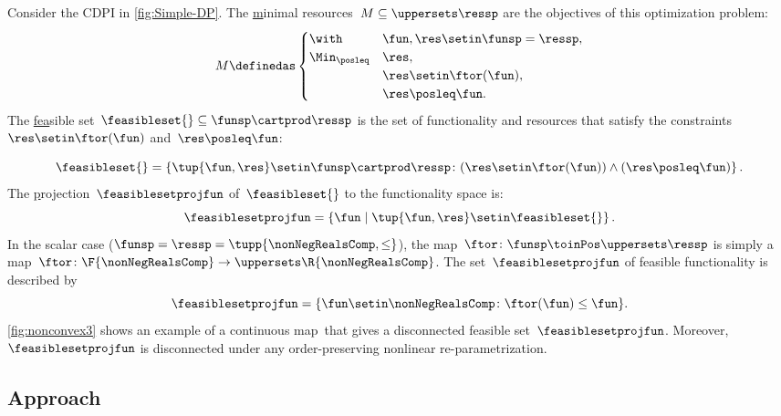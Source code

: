 \begin{example}
    \label{exa:one}
    Consider the CDPI in \cref{fig:Simple-DP}.
    The \uline{m}inimal resources~$M\subseteq\uppersets \ressp$ are the objectives of this optimization problem:
    \begin{equation*}
        M\definedas\begin{cases}
            \with          & \fun,\res\setin\funsp=\ressp, \\
            \Min_{\posleq} & \res,                      \\
                           & \res\setin\ftor(\fun),        \\
                           & \res\posleq\fun.
        \end{cases}
    \end{equation*}
    The \uline{fea}sible set~$\feasibleset{}\subseteq\funsp\cartprod\ressp$ is the set of functionality and resources that satisfy the constraints~$\res\setin\ftor(\fun)$ and~$\res\posleq\fun$:

    \begin{equation}
        \feasibleset{}=\left\{ \tup{\fun,\res}\setin\funsp\cartprod\ressp\colon (\res\setin\ftor(\fun))\wedge(\res\posleq\fun)\right\} .
        \label{eq:feasible}
    \end{equation}
    The \uline{p}rojection~$\feasiblesetprojfun$ of~$\feasibleset{}$ to the functionality space is:
    \begin{equation*}
        \feasiblesetprojfun=\left\{ \fun\mid\tup{\fun,\res} \setin\feasibleset{}\right\}.
    \end{equation*}
    In the scalar case ($\funsp=\ressp=\tupp{\nonNegRealsComp,\leq}$), the map~$\ftor\colon\funsp\toinPos\uppersets \ressp$ is simply a map~$\ftor\colon\F{\nonNegRealsComp}\to \uppersets\R{\nonNegRealsComp}$.
    The set~$\feasiblesetprojfun$ of feasible functionality is described by
    \begin{equation}
        \feasiblesetprojfun=\{\fun\setin\nonNegRealsComp\colon \ftor(\fun)\leq\fun\}.
        \label{eq:Pfeasible}
    \end{equation}
    \cref{fig:nonconvex3} shows an example of a continuous map~\ftor that gives a disconnected feasible set~$\feasiblesetprojfun$.
    Moreover,~$\feasiblesetprojfun$ is disconnected under any order-preserving nonlinear re-parametrization.

\end{example}

\subsection{Approach}

